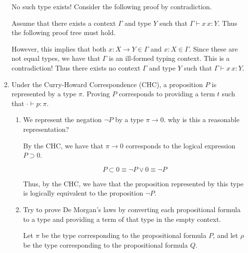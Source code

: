 \documentclass[10pt,\jkfside,a4paper]{article}
\begin{document}
\begin{enumerate}
    No such type exists! Consider the following proof by contradiction.

    Assume that there exists a context $\Gamma$ and type $Y$ such that $\Gamma \vdash x\, x: Y$. Thus the following proof tree must hold.

    \begin{figure}[H]

        \centering

        \begin{prooftree}
        \end{prooftree}

    \end{figure}

    However, this implies that both $x: X \to Y \in \Gamma$ and $x: X \in \Gamma$. Since these are not equal types, we have that $\Gamma$ is an ill-formed typing context. This is a contradiction! Thus there
    exists no context $\Gamma$ and type $Y$ such that $\Gamma \vdash x\, x: Y$.

    \item Under the Curry-Howard Correspondence (CHC), a proposition $P$ is represented by a type $\pi$. Proving $P$ corresponds to providing a term $t$ such that $\cdot \vdash p: \pi$.

    \begin{enumerate}

        \item We represent the negation $\neg P$ by a type $\pi \to 0$. why is this a reasonable representation?

        By the CHC, we have that $\pi \to 0$ corresponds to the logical expression $P \supset 0$.

        \[
            P \subset 0 \equiv \neg P \vee 0 \equiv \neg P
        \]

        Thus, by the CHC, we have that the proposition represented by this type is logically equivalent to the proposition $\neg P$.

        \item Try to prove De Morgan's laws by converting each propositional formula to a type and providing a term of that type in the empty context.

        Let $\pi$ be the type corresponding to the propositional formula $P$, and let $\rho$ be the type corresponding to the propositional formula $Q$.


\end{enumerate}
\end{enumerate}
\end{document}
